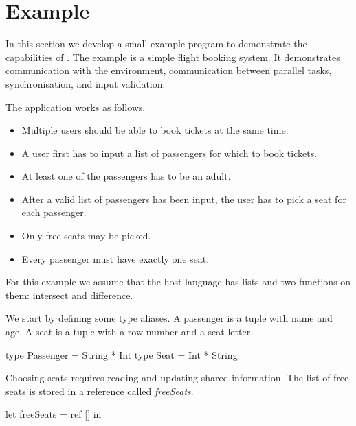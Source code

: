 
\section{Example}


In this section we develop a small example program to demonstrate the capabilities of \TOPHAT.
The example is a simple flight booking system.
It demonstrates communication with the environment, communication between parallel tasks, synchronisation, and input validation.

The application works as follows.
\begin{itemize}
\item Multiple users should be able to book tickets at the same time.
\item A user first has to input a list of passengers for which to book tickets.
\item At least one of the passengers has to be an adult.
\item After a valid list of passengers has been input, the user has to pick a seat for each passenger.
\item Only free seats may be picked.
\item Every passenger must have exactly one seat.
\end{itemize}
For this example we assume that the host language has lists and two functions on them: intersect and difference.

We start by defining some type aliases.
A passenger is a tuple with name and age.
A seat is a tuple with a row number and a seat letter.
\begin{TASK}
  type Passenger = String * Int
  type Seat = Int * String
\end{TASK}

Choosing seats requires reading and updating shared information.
The list of free seats is stored in a reference called \emph{freeSeats}.
\begin{TASK}
  let freeSeats = ref [] in
\end{TASK}

